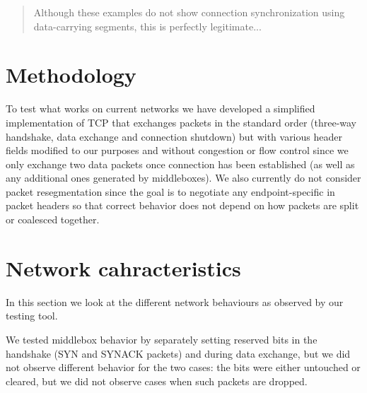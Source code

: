 \documentclass{sig-alternate-10pt}
\begin{document}
\begin{quotation}
	Although these
	examples do not show connection synchronization using data-carrying
	segments, this is perfectly legitimate...
\end{quotation}

\section{Methodology}

To test what works on current networks we have developed a simplified implementation of TCP that exchanges packets in the standard order (three-way handshake, data exchange and connection shutdown) but with various header fields modified to our purposes and without congestion or flow control since we only exchange two data packets once connection has been established (as well as any additional ones generated by middleboxes). We also currently do not consider packet resegmentation since the goal is to negotiate any endpoint-specific in packet headers so that correct behavior does not depend on how packets are split or coalesced together.

\section{Network cahracteristics}
\label{sec:network}

In this section we look at the different network behaviours as observed by our testing tool.

We tested middlebox behavior by separately setting reserved bits in the handshake (SYN and SYNACK packets) and during data exchange, but we did not observe different behavior for the two cases: the bits were either untouched or cleared, but we did not observe cases when such packets are dropped.
\end{document}
